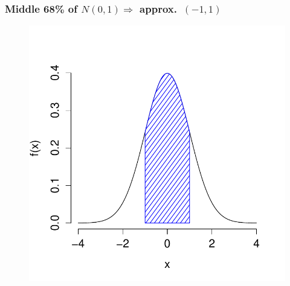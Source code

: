 \documentclass[handout]{beamer}
\begin{document}

\begin{frame}
\frametitle{Middle 68\% of $N(0,1) \Rightarrow$ approx.\ $(-1,1)$}
\begin{figure}
\includegraphics[scale = 0.65]{./images/normal_middle68}
\end{figure}
\end{frame}

\end{document}
